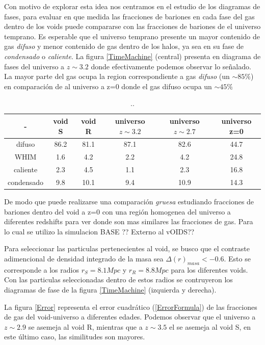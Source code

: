 Con motivo de explorar esta idea nos centramos en el estudio de los diagramas de fases, para evaluar en que medida las fracciones de bariones en cada fase del gas dentro de los voids puede compararse con las fracciones de bariones de el universo temprano. Es esperable que el universo temprano presente un mayor contenido de gas \textit{difuso} y menor contenido de gas dentro de los halos, ya sea en su fase de \textit{condensado} o \textit{caliente}. La figura \ref{TimeMachine} (central) presenta en diagrama de fases del universo a $z\sim3.2$ donde efectivamente podemos observar lo se\~nalado. La mayor parte del gas ocupa la region correspondiente a gas \textit{difuso} (un $\sim 85\%$) en comparaci\'on de al universo a z=0 donde el gas difuso ocupa un $\sim45\%$


\begin{table}[ht]
\begin{tabular}{c|c|c|c|c|c}
    - & void S & void R & universo $z\sim 3.2$ &universo $z\sim 2.7$ &universo z=0 \\
\hline    difuso     & 86.2  & 81.1  & 87.1  &  82.6   & 44.7\\
\hline    WHIM       & 1.6   & 4.2   & 2.2   &  4.2    & 24.8\\
\hline    caliente   & 2.3   & 4.5   & 1.1   &  2.3    & 16.8\\
\hline    condensado & 9.8   & 10.1  & 9.4   &  10.9   & 14.3\\
\hline
\end{tabular}
\caption{..}
\label{FraccionesGasTabla}
\end{table}

De modo que puede realizarse una comparaci\'on \textit{gruesa} estudiando fracciones de bariones dentro del void a z=0 con una regi\'on homogenea del universo a diferentes redshifts para ver donde son mas similares las fracciones de gas. Para lo cual se utilizo la simulacion BASE ?? Externo al vOIDS?? 

Para seleccionar las particulas pertenecientes al void, se busco que el contraste adimencional de densidad integrado de la masa sea $\Delta(r)_{masa}<-0.6$. Esto se corresponde a los radios $r_{S}=8.1Mpc$ y $r_{R}=8.8 Mpc$ para los diferentes voids. Con las particulas seleccionadas dentro de estos radios se contruyeron los diagramas de fase de la figura \ref{TimeMachine} (izquierda y derecha). 


La figura \ref{Error} representa el error cuadr\'atico (\ref{ErrorFormula}) de las fracciones de gas del void-universo a diferentes edades. Podemos observar que el universo a $z\sim2.9$ se asemeja al void R, mientras que a $z\sim3.5$ el se asemeja al void S, en este \'ultimo caso, las similitudes son mayores. 


